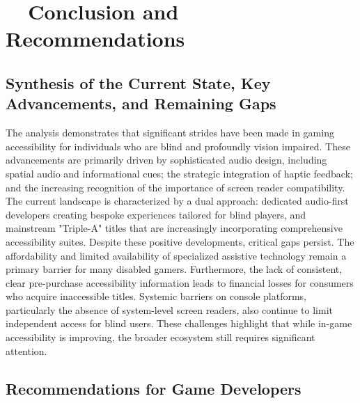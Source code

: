 \section{~~Conclusion and Recommendations}


\subsection{Synthesis of the Current State, Key Advancements, and Remaining Gaps}

The analysis demonstrates that significant strides have been made in gaming accessibility for individuals who are blind and profoundly vision impaired. These advancements are primarily driven by sophisticated audio design, including spatial audio and informational cues; the strategic integration of haptic feedback; and the increasing recognition of the importance of screen reader compatibility. The current landscape is characterized by a dual approach: dedicated audio-first developers creating bespoke experiences tailored for blind players, and mainstream "Triple-A" titles that are increasingly incorporating comprehensive accessibility suites.
Despite these positive developments, critical gaps persist. The affordability and limited availability of specialized assistive technology remain a primary barrier for many disabled gamers. Furthermore, the lack of consistent, clear pre-purchase accessibility information leads to financial losses for consumers who acquire inaccessible titles. Systemic barriers on console platforms, particularly the absence of system-level screen readers, also continue to limit independent access for blind users. These challenges highlight that while in-game accessibility is improving, the broader ecosystem still requires significant attention.

\subsection{Recommendations for Game Developers}

